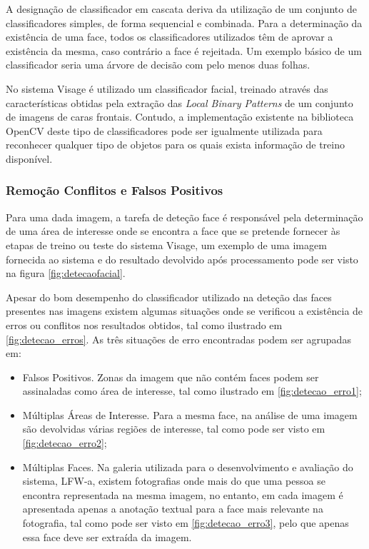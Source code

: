 A designação de classificador em cascata deriva da utilização de um conjunto de classificadores simples, de forma sequencial e combinada. Para a determinação da existência de uma face, todos os classificadores utilizados  têm de aprovar a existência da mesma, caso contrário a face é rejeitada. Um exemplo básico de um classificador seria uma árvore de decisão com pelo menos duas folhas.

No sistema Visage é utilizado um classificador facial, treinado através das características obtidas pela extração das \textit{Local Binary Patterns} \cite{Ahonen2006} de um conjunto de imagens de caras frontais. Contudo, a implementação existente na biblioteca OpenCV deste tipo de classificadores pode ser igualmente utilizada para reconhecer qualquer tipo de objetos para os quais exista informação de treino disponível.

\subsubsection*{Remoção Conflitos e Falsos Positivos}
Para uma dada imagem, a tarefa de deteção face é responsável pela determinação de uma área de interesse onde se encontra a face que se pretende fornecer às etapas de treino ou teste do sistema Visage, um exemplo de uma imagem fornecida ao sistema e do resultado devolvido após processamento pode ser visto na figura \ref{fig:detecaofacial}. 

Apesar do bom desempenho do classificador utilizado na deteção das faces presentes nas imagens existem algumas situações onde se verificou a existência de erros ou conflitos nos resultados obtidos, tal como ilustrado em \ref{fig:detecao_erros}. As três situações de erro encontradas podem ser agrupadas em:
\begin{itemize}
\item Falsos Positivos. Zonas da imagem que não contém faces podem ser assinaladas como área de interesse, tal como ilustrado em \ref{fig:detecao_erro1};
\item Múltiplas Áreas de Interesse. Para a mesma face, na análise de uma imagem são devolvidas várias regiões de interesse, tal como pode ser visto em \ref{fig:detecao_erro2};
\item Múltiplas Faces. Na galeria utilizada para o desenvolvimento e avaliação do sistema, LFW-a, existem fotografias onde mais do que uma pessoa se encontra representada na mesma imagem, no entanto, em cada imagem é apresentada apenas a anotação textual para a face mais relevante na fotografia, tal como pode ser visto em \ref{fig:detecao_erro3}, pelo que apenas essa face deve ser extraída da imagem.
\end{itemize}

